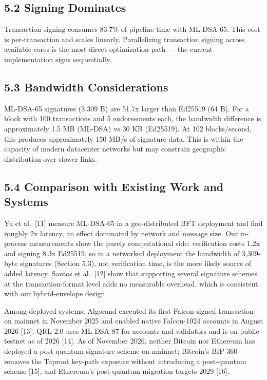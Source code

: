 \documentclass[
]{article}
\begin{document}
\subsection{5.2 Signing Dominates}\label{signing-dominates}

Transaction signing consumes 83.7\% of pipeline time with ML-DSA-65.
This cost is per-transaction and scales linearly. Parallelizing
transaction signing across available cores is the most direct
optimization path --- the current implementation signs sequentially.

\subsection{5.3 Bandwidth
Considerations}\label{bandwidth-considerations}

ML-DSA-65 signatures (3,309 B) are 51.7x larger than Ed25519 (64 B). For
a block with 100 transactions and 5 endorsements each, the bandwidth
difference is approximately 1.5 MB (ML-DSA) vs 30 KB (Ed25519). At 102
blocks/second, this produces approximately 150 MB/s of signature data.
This is within the capacity of modern datacenter networks but may
constrain geographic distribution over slower links.

\subsection{5.4 Comparison with Existing Work and
Systems}\label{comparison-with-existing-work-and-systems}

Yu et al.~{[}11{]} measure ML-DSA-65 in a geo-distributed BFT deployment
and find roughly 2x latency, an effect dominated by network and message
size. Our in-process measurements show the purely computational side:
verification costs 1.2x and signing 8.3x Ed25519, so in a networked
deployment the bandwidth of 3,309-byte signatures (Section 5.3), not
verification time, is the more likely source of added latency. Santos et
al.~{[}12{]} show that supporting several signature schemes at the
transaction-format level adds no measurable overhead, which is
consistent with our hybrid-envelope design.

Among deployed systems, Algorand executed its first Falcon-signed
transaction on mainnet in November 2025 and enabled native Falcon-1024
accounts in August 2026 {[}13{]}. QRL 2.0 uses ML-DSA-87 for accounts
and validators and is on public testnet as of 2026 {[}14{]}. As of
November 2026, neither Bitcoin nor Ethereum has deployed a post-quantum
signature scheme on mainnet; Bitcoin's BIP-360 removes the Taproot
key-path exposure without introducing a post-quantum scheme {[}15{]},
and Ethereum's post-quantum migration targets 2029 {[}16{]}.
\end{document}
